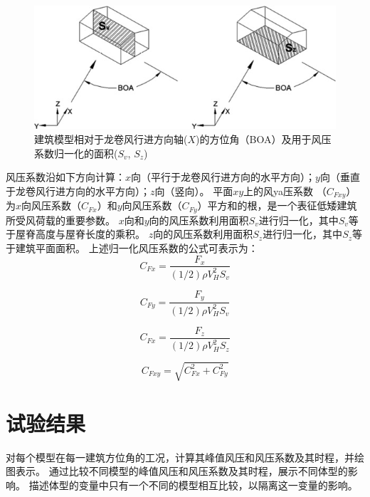 \documentclass{ctexart}
\begin{document}
\begin{figure}
\centering
\includegraphics{./fig/3}
\caption{建筑模型相对于龙卷风行进方向轴($X$)的方位角（BOA）及用于风压系数归一化的面积($S_v$, $S_z$)}
\label{fig:BOA}
\end{figure}


风压系数沿如下方向计算：$x$向（平行于龙卷风行进方向的水平方向）；$y$向（垂直于龙卷风行进方向的水平方向）；$z$向（竖向）。
平面$xy$上的风ya压系数 （$C_{Fxy}$）为$x$向风压系数（$C_{Fx}$）和$y$向风压系数（$C_{Fy}$）平方和的根，是一个表征低矮建筑所受风荷载的重要参数。
$x$向和$y$向的风压系数利用面积$S_v$进行归一化，其中$S_v$等于屋脊高度与屋脊长度的乘积。
$z$向的风压系数利用面积$S_z$进行归一化，其中$S_z$等于建筑平面面积。
上述归一化风压系数的公式可表示为：
\begin{equation}
	C_{Fx}=\frac{F_x}{(1/2)\rho V_H^2 S_v}
\end{equation}

\begin{equation}
	C_{Fy}=\frac{F_y}{(1/2)\rho V_H^2 S_v}
\end{equation}

\begin{equation}
	C_{Fx}=\frac{F_z}{(1/2)\rho V_H^2 S_z}
\end{equation}

\begin{equation}
	C_{Fxy}=\sqrt{C_{Fx}^2+C_{Fy}^2}
\end{equation}

\section{试验结果}
对每个模型在每一建筑方位角的工况，计算其峰值风压和风压系数及其时程，并绘图表示。
通过比较不同模型的峰值风压和风压系数及其时程，展示不同体型的影响。
描述体型的变量中只有一个不同的模型相互比较，以隔离这一变量的影响。
\end{document}
